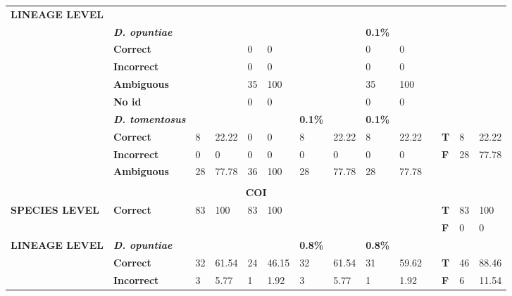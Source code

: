 \begin{landscape}
\begin{table}[!htp]
{\begin{tabular}{@{}llllllllllllll@{}}
\textbf{LINEAGE LEVEL} &  &  &  &  &  &  &  &  &  &  &  &  &  \\
 & \textit{\textbf{D. opuntiae}} &  &  &  &  &  &  & \textbf{0.1\%} &  &  &  &  &  \\
 & \textbf{Correct} &  &  & 0 & 0 &  &  & 0 & 0 &  &  &  &  \\
 & \textbf{Incorrect} &  &  & 0 & 0 &  &  & 0 & 0 &  &  &  &  \\
 & \textbf{Ambiguous} &  &  & 35 & 100 &  &  & 35 & 100 &  &  &  &  \\
 & \textbf{No id} &  &  & 0 & 0 &  &  & 0 & 0 &  &  &  &  \\
 & \textit{\textbf{D. tomentosus}} &  &  &  &  & \textbf{0.1\%} &  & \textbf{0.1\%} &  &  &  &  &  \\
 & \textbf{Correct} & 8 & 22.22 & 0 & 0 & 8 & 22.22 & 8 & 22.22 &  & \textbf{T} & 8 & 22.22 \\
 & \textbf{Incorrect} & 0 & 0 & 0 & 0 & 0 & 0 & 0 & 0 &  & \textbf{F} & 28 & 77.78 \\
 & \textbf{Ambiguous} & 28 & 77.78 & 36 & 100 & 28 & 77.78 & 28 & 77.78 &  &  &  &  \\
 &  &  &  &  &  &  &  &  &  &  &  &  &  \\ \midrule
\multicolumn{14}{c}{\textbf{COI}} \\ \midrule
\textbf{SPECIES LEVEL} & \textbf{Correct} & 83 & 100 & 83 & 100 &  &  &  &  &  & \textbf{T} & 83 & 100 \\
 &  &  &  &  &  &  &  &  &  &  & \textbf{F} & 0 & 0 \\
\textbf{LINEAGE LEVEL} & \textit{\textbf{D. opuntiae}}  &  &  &  &  & \textbf{0.8\%} &  & \textbf{0.8\%} &  &  &  &  &  \\
 & \textbf{Correct} & 32 & 61.54 & 24 & 46.15 & 32 & 61.54 & 31 & 59.62 &  & \textbf{T} & 46 & 88.46 \\
 & \textbf{Incorrect} & 3 & 5.77 & 1 & 1.92 & 3 & 5.77 & 1 & 1.92 &  & \textbf{F} & 6 & 11.54 \\

\end{tabular}}
\end{table}
\end{landscape}
